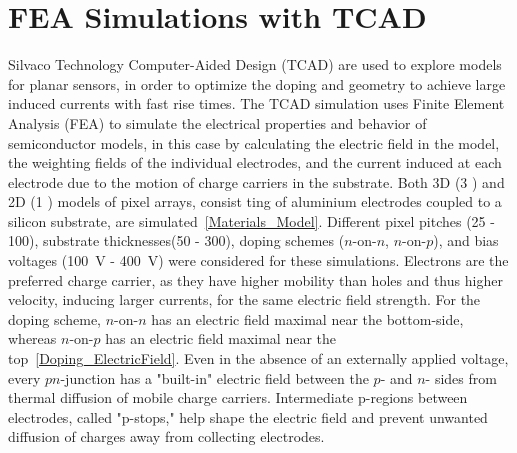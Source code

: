 \section{FEA Simulations with TCAD}
Silvaco Technology Computer-Aided Design (TCAD) are used to explore models for planar sensors, in order to optimize the doping and geometry to achieve large induced currents with fast rise times.
The TCAD simulation uses Finite Element Analysis (FEA) to simulate the electrical properties and behavior of semiconductor models, in this case by calculating the electric field in the model, the weighting fields of the individual electrodes, and the current induced at each electrode due to the motion of charge carriers in the substrate.
Both 3D (3 ) and 2D (1 ) models of pixel arrays, consist ting of aluminium electrodes coupled to a silicon substrate, are simulated~\ref{Materials_Model}.
Different pixel pitches (\SI{25}{\micron} - \SI{100}{\micron}), substrate thicknesses(\SI{50}{\micron} - \SI{300}{\micron}), doping schemes ($n$-on-$n$, $n$-on-$p$), and bias voltages (\SI{100}{\V} - \SI{400}{\V}) were considered for these simulations.
Electrons are the preferred charge carrier, as they have higher mobility than holes and thus higher velocity, inducing larger currents, for the same electric field strength.
For the doping scheme, $n$-on-$n$ has an electric field maximal near the bottom-side, whereas $n$-on-$p$ has an electric field maximal near the top~\ref{Doping_ElectricField}.
Even in the absence of an externally applied voltage, every $pn$-junction has a "built-in" electric field between the $p$- and $n$- sides from thermal diffusion of mobile charge carriers.
Intermediate p-regions between electrodes, called "p-stops," help shape the electric field and prevent unwanted diffusion of charges away from collecting electrodes.
